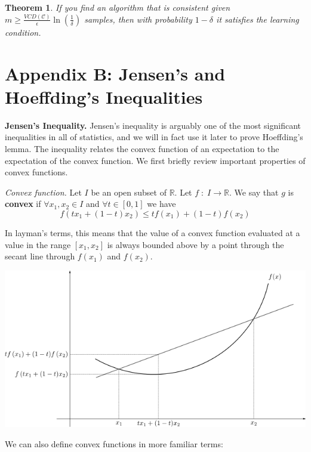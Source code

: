 \documentclass{article}
\newtheorem{thm}{Theorem}
\begin{document}
\begin{framed}
\begin{thm}
    If you find an algorithm that is consistent given
    $m \geq \frac{VCD(\mathcal{C})}{\epsilon}\ln(\frac{1}{\delta})$ samples,
    then with probability $1-\delta$ it satisfies the
    learning condition.
\end{thm}
\end{framed}

\section{Appendix B: Jensen's and Hoeffding's Inequalities}

\textbf{Jensen's Inequality.} Jensen's inequality is arguably one of the most
significant inequalities in all of statistics, and we will in fact use it later
to prove Hoeffding's lemma. The inequality relates the convex function of an
expectation to the expectation of the convex function. We first briefly review
important properties of convex functions.

\emph{Convex function.} Let $I$ be an open subset of $\mathbb{R}$.
Let $f\;:\;I\rightarrow \mathbb{R}$. We say that $g$ is \textbf{convex} if
$\forall x_1, x_2 \in I$ and $\forall t \in [0, 1]$ we have
$$f(t x_1 + (1-t) x_2) \leq t f(x_1) + (1-t)f(x_2)$$

In layman's terms, this means that the value of a convex function evaluated at a
value in the range $[x_1, x_2]$ is always bounded above by a point through the
secant line through $f(x_1)$ and $f(x_2)$.

\begin{center}
\includegraphics[width=\textwidth*6/8]{convexfunction.png}
\end{center}

We can also define convex functions in more familiar terms:
\end{document}
